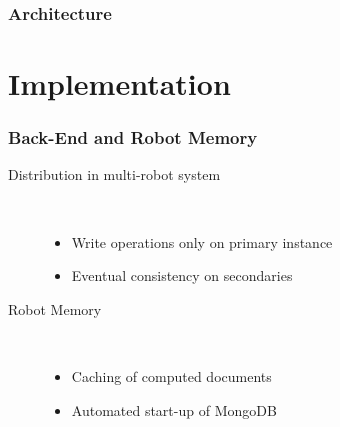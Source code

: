 \begin{frame}
  \frametitle{Architecture}
  \hspace{-1.3cm}

\end{frame}


\section{Implementation}

\begin{frame}
  \frametitle{Back-End and Robot Memory}
  \begin{description}
  \item[Distribution in multi-robot system]
                \hfill \\
    \begin{itemize}
    \item Write operations only on primary instance
    \item Eventual consistency on secondaries %
    \end{itemize}
\bigskip
  \item[Robot Memory]
                \hfill \\
    \begin{itemize}
    \item Caching of computed documents
    \item Automated start-up of MongoDB
    \end{itemize}
  \end{description}
\end{frame}


